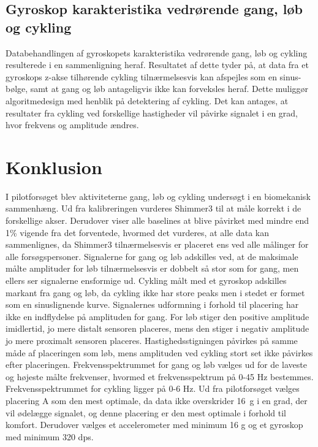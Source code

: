 \subsection{Gyroskop karakteristika vedrørende gang, løb og cykling}
Databehandlingen af gyroskopets karakteristika vedrørende gang, løb og cykling resulterede i en sammenligning heraf. Resultatet af dette tyder på, at data fra et gyroskops z-akse tilhørende cykling tilnærmelsesvis kan afspejles som en sinus-bølge, samt at gang og løb antageligvis ikke kan forveksles heraf. Dette muliggør algoritmedesign med henblik på detektering af cykling. Det kan antages, at resultater fra cykling ved forskellige hastigheder vil påvirke signalet i en grad, hvor frekvens og amplitude ændres.

\section{Konklusion}
I pilotforsøget blev aktiviteterne gang, løb og cykling undersøgt i en biomekanisk sammenhæng. Ud fra kalibreringen vurderes Shimmer3 til at måle korrekt i de forskellige akser. Derudover viser alle baselines at blive påvirket med mindre end 1\% vigende fra det forventede, hvormed det vurderes, at alle data kan sammenlignes, da Shimmer3 tilnærmelsesvis er placeret ens ved alle målinger for alle forsøgspersoner. \newline
Signalerne for gang og løb adskilles ved, at de maksimale målte amplituder for løb tilnærmelsesvis er dobbelt så stor som for gang, men ellers ser signalerne ensformige ud. Cykling målt med et gyroskop adskilles markant fra gang og løb, da cykling ikke har store peaks men i stedet er formet som en sinuslignende kurve. \newline
Signalernes udformning i forhold til placering har ikke en indflydelse på amplituden for gang. For løb stiger den positive amplitude imidlertid, jo mere distalt sensoren placeres, mens den stiger i negativ amplitude jo mere proximalt sensoren placeres. Hastighedsstigningen påvirkes på samme måde af placeringen som løb, mens amplituden ved cykling stort set ikke påvirkes efter placeringen. \newline
Frekvensspektrummet for gang og løb vælges ud for de laveste og højeste målte frekvenser, hvormed et frekvensspektrum på 0-45 Hz bestemmes. Frekvensspektrummet for cykling ligger på 0-6 Hz.\newline
Ud fra pilotforsøget vælges placering A som den mest optimale, da data ikke overskrider 16~g i en grad, der vil ødelægge signalet, og denne placering er den mest optimale i forhold til komfort. Derudover vælges et accelerometer med minimum 16 g og et gyroskop med minimum 320 dps.